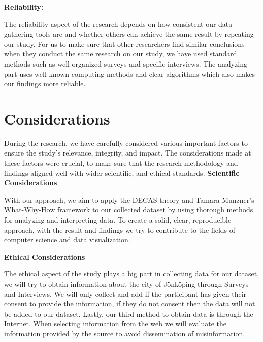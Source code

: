 \textbf{Reliability:}

The reliability aspect of the research depends on how consistent our data gathering tools are and whether others can achieve the same result by repeating our study. For us to make sure that other researchers find similar conclusions when they conduct the same research on our study, we have used standard methods such as well-organized surveys and specific interviews. The analyzing part uses well-known computing methods and clear algorithms which also makes our findings more reliable.
\section{Considerations}

During the research, we have carefully considered various important factors to ensure the study’s relevance, integrity, and impact. The considerations made at these factors were crucial, to make sure that the research methodology and findings aligned well with wider scientific, and ethical standards. 
\textbf{Scientific Considerations}

With our approach, we aim to apply the DECAS theory and Tamara Munzner’s What-Why-How framework to our collected dataset by using thorough methods for analyzing and interpreting data. To create a solid, clear, reproducible approach, with the result and findings we try to contribute to the fields of computer science and data visualization.

\textbf{Ethical Considerations}

The ethical aspect of the study plays a big part in collecting data for our dataset, we will try to obtain information about the city of Jönköping through Surveys and Interviews. We will only collect and add if the participant has given their consent to provide the information, if they do not consent then the data will not be added to our dataset. Lastly, our third method to obtain data is through the Internet. When selecting information from the web we will evaluate the information provided by the source to avoid dissemination of misinformation. 


